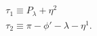 \begin{equation}
 \begin{array}{l}
 \tau_1\equiv P_\lambda+\eta^2 \\ \tau_2\equiv
 \pi-\phi'-\lambda-\eta^1.
 \end{array}
 \label{a57}
 \end{equation}


